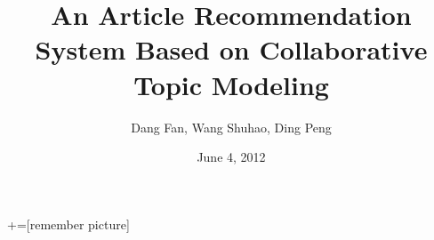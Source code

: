 \documentclass[12pt]{beamer}
\author{Dang Fan, Wang Shuhao, Ding Peng}
\title[AR on CTM]{An Article Recommendation System Based on Collaborative Topic Modeling}
\institute{Tsinghua University}
\date{June 4, 2012}
\begin{document}

+=[remember picture]





% 	
\end{document}
